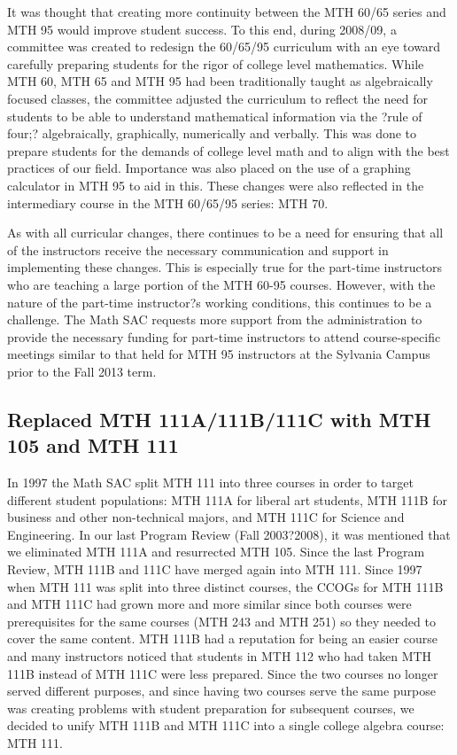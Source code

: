 It was thought that creating more continuity between the MTH 60/65 series and MTH 95 would improve student success.  To this end, during 2008/09, a committee was created to redesign the 60/65/95 curriculum with an eye toward carefully preparing students for the rigor of college level mathematics.  While MTH 60, MTH 65 and MTH 95 had been traditionally taught as algebraically focused classes, the committee adjusted the curriculum to reflect the need for students to be able to understand mathematical information via the ?rule of four;? algebraically, graphically, numerically and verbally.  This was done to prepare students for the demands of college level math and to align with the best practices of our field.  Importance was also placed on the use of a graphing calculator in MTH 95 to aid in this.  These changes were also reflected in the intermediary course in the MTH 60/65/95 series: MTH 70.
 
As with all curricular changes, there continues to be a need for ensuring that all of the instructors receive the necessary communication and support in implementing these changes.  This is especially true for the part-time instructors who are teaching a large portion of the MTH 60-95 courses.  However, with the nature of the part-time instructor?s working conditions, this continues to be a challenge.  The Math SAC requests more support from the administration to provide the necessary funding for part-time instructors to attend course-specific meetings similar to that held for MTH 95 instructors at the Sylvania Campus prior to the Fall 2013 term.
 
\subsection{Replaced MTH 111A/111B/111C with MTH 105 and MTH 111}
In 1997 the Math SAC split MTH 111 into three courses in order to target different student populations: MTH 111A for liberal art students, MTH 111B for business and other non-technical majors, and MTH 111C for Science and Engineering.  In our last Program Review (Fall 2003?2008), it was mentioned that we eliminated MTH 111A and resurrected MTH 105.  Since the last Program Review, MTH 111B and 111C have merged again into MTH 111.  Since 1997 when MTH 111 was split into three distinct courses, the CCOGs for MTH 111B and MTH 111C had grown more and more similar since both courses were prerequisites for the same courses (MTH 243 and MTH 251) so they needed to cover the same content.  MTH 111B had a reputation for being an easier course and many instructors noticed that students in MTH 112 who had taken MTH 111B instead of MTH 111C were less prepared.  Since the two courses no longer served different purposes, and since having two courses serve the same purpose was creating problems with student preparation for subsequent courses, we decided to unify MTH 111B and MTH 111C into a single college algebra course: MTH 111.
 
